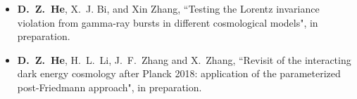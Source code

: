   \begin{itemize}[leftmargin=*]
    \item \textbf{D.~Z.~He}, X.~J. Bi, and Xin Zhang, ``Testing the Lorentz invariance violation from gamma-ray bursts in different cosmological models", in preparation.
      
    \item \textbf{D.~Z.~He}, H.~L.~Li, J.~F.~Zhang and X.~Zhang, ``Revisit of the interacting dark energy cosmology after Planck 2018: application of the parameterized post-Friedmann approach", in preparation.  
 

    

    \end{itemize}